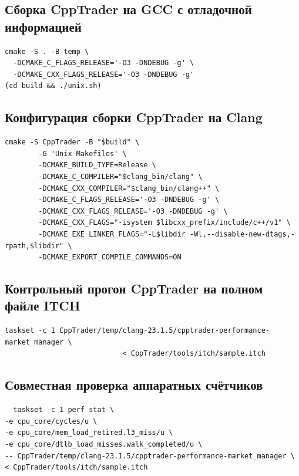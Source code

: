 \documentclass[a4paper,12pt]{article}
\begin{document}
\subsection{Сборка CppTrader на GCC с отладочной информацией}
\label{app:cmd-gcc}
\begin{lstlisting}
cmake -S . -B temp \
  -DCMAKE_C_FLAGS_RELEASE='-O3 -DNDEBUG -g' \
  -DCMAKE_CXX_FLAGS_RELEASE='-O3 -DNDEBUG -g'
(cd build && ./unix.sh)
\end{lstlisting}

\subsection{Конфигурация сборки CppTrader на Clang}
\label{app:cmd-cpptrader}
\begin{lstlisting}
cmake -S CppTrader -B "$build" \
        -G 'Unix Makefiles' \
        -DCMAKE_BUILD_TYPE=Release \
        -DCMAKE_C_COMPILER="$clang_bin/clang" \
        -DCMAKE_CXX_COMPILER="$clang_bin/clang++" \
        -DCMAKE_C_FLAGS_RELEASE='-O3 -DNDEBUG -g' \
        -DCMAKE_CXX_FLAGS_RELEASE='-O3 -DNDEBUG -g' \
        -DCMAKE_CXX_FLAGS="-isystem $libcxx_prefix/include/c++/v1" \
        -DCMAKE_EXE_LINKER_FLAGS="-L$libdir -Wl,--disable-new-dtags,-rpath,$libdir" \
        -DCMAKE_EXPORT_COMPILE_COMMANDS=ON
\end{lstlisting}

\subsection{Контрольный прогон CppTrader на полном файле ITCH}
\label{app:cmd-itch}
\begin{lstlisting}
taskset -c 1 CppTrader/temp/clang-23.1.5/cpptrader-performance-market_manager \
                            < CppTrader/tools/itch/sample.itch
\end{lstlisting}

\subsection{Совместная проверка аппаратных счётчиков}
\label{app:cmd-perf}
\begin{lstlisting}
  taskset -c 1 perf stat \
-e cpu_core/cycles/u \
-e cpu_core/mem_load_retired.l3_miss/u \
-e cpu_core/dtlb_load_misses.walk_completed/u \
-- CppTrader/temp/clang-23.1.5/cpptrader-performance-market_manager \
< CppTrader/tools/itch/sample.itch
\end{lstlisting}
\end{document}
